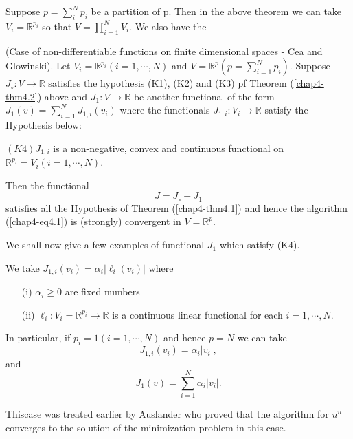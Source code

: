 \begin{remark}\label{chap4-rem4.4}
Suppose $p = \sum\limits_{i}^{N} p_{i}$ be a partition of p. Then in the above theorem we can take $V_{i} = \mathbb{R}^{p_{i}}$ so that $V = \prod\limits_{i=1}^{N} V_{i}$. We also have the
\end{remark}

\begin{theorem}\label{chap4-thm4.3}
(Case of non-differentiable functions on finite dimensional spaces - Cea and Glowinski). Let $V_{i} = \mathbb{R}^{p_{i}} (i = 1, \cdots, N)$ and $V = \mathbb{R}^{p} (p = \sum\limits_{i=1}^{N} p_{i})$. Suppose $J_{\circ} : V \to \mathbb{R}$ satisfies the hypothesis (K1), (K2) and (K3) pf Theorem (\ref{chap4-thm4.2}) above and $J_{1} : V \to \mathbb{R}$ be another functional of the form $J_{1} (v) = \sum\limits_{i=1}^{N} J_{1, i} (v_{i})$ where the functionals $J_{1, i} : V_{i} \to \mathbb{R}$ satisfy the Hypothesis below:

$(K4) J_{1, i}$ is a non-negative, convex and continuous functional on\break $\mathbb{R}^{p_{i}} = V_{i} (i = 1, \cdots, N)$.
\end{theorem}

Then the functional
$$
J = J_{\circ} + J_{1}
$$
satisfies all the Hypothesis of Theorem (\ref{chap4-thm4.1}) and hence the algorithm (\ref{chap4-eq4.1}) is (strongly) convergent in $V = \mathbb{R}^{p}$.

We shall now give a few examples of functional $J_{1}$ which satisfy (K4).
\begin{example}\label{chap4-exam4.1}
We take $J_{1, i} (v_{i}) = \alpha_{i} |\ell_{i} (v_{i})|$ where
\begin{enumerate}
\item[(i)] $\alpha_{i} \geq 0$ are fixed numbers
\item[(ii)] $\ell_{i} : V_{i} = \mathbb{R}^{p_{i}} \to \mathbb{R}$ is a continuous linear functional for each $i = 1, \cdots, N.$
\end{enumerate}
\end{example}

In particular, if $p_{i} = 1(i = 1,\cdots, N)$ and hence $p = N$ we can take
$$
J_{1, i}(v_{i}) = \alpha_{i} |v_{i}|,
$$
and
$$
J_{1}(v) = \sum_{i=1}^{N} \alpha_{i} |v_{i}|.
$$

This\pageoriginale case was treated earlier by Auslander \cite{key53} who proved that the algorithm for $u^{n}$ converges to the solution of the minimization problem in this case.

